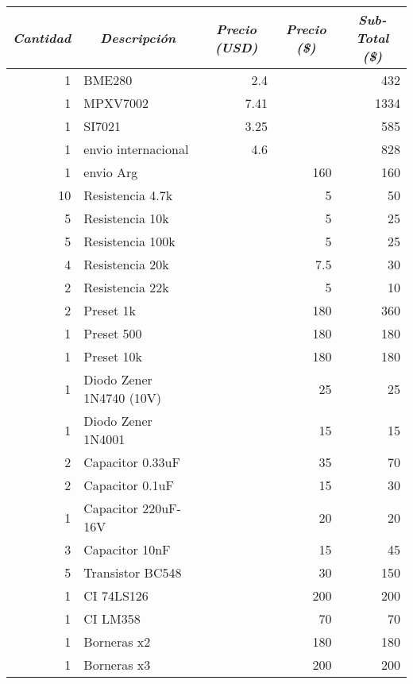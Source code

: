 \begin{table}[h]
	\centering
	\begin{tabular}{|r|l|l|r|r|}
		\hline
		\multicolumn{1}{|c|}{\textit{\textbf{Cantidad}}} & \multicolumn{1}{c|}{\textit{\textbf{Descripción}}} & \multicolumn{1}{c|}{\textit{\textbf{Precio (USD)}}} & \multicolumn{1}{c|}{\textit{\textbf{Precio (\$)}}} & \multicolumn{1}{c|}{\textit{\textbf{Sub-Total  (\$)}}} \\ \hline
		1 & BME280 & \multicolumn{1}{r|}{2.4} & \multicolumn{1}{l|}{} & 432 \\ \hline
		1 & MPXV7002 & \multicolumn{1}{r|}{7.41} & \multicolumn{1}{l|}{} & 1334 \\ \hline
		1 & SI7021 & \multicolumn{1}{r|}{3.25} & \multicolumn{1}{l|}{} & 585 \\ \hline
		1 & envio internacional & \multicolumn{1}{r|}{4.6} & \multicolumn{1}{l|}{} & 828 \\ \hline
		1 & envio Arg &  & 160 & 160 \\ \hline
		10 & Resistencia 4.7k &  & 5 & 50 \\ \hline
		5 & Resistencia 10k &  & 5 & 25 \\ \hline
		5 & Resistencia 100k &  & 5 & 25 \\ \hline
		4 & Resistencia 20k &  & 7.5 & 30 \\ \hline
		2 & Resistencia 22k &  & 5 & 10 \\ \hline
		2 & Preset 1k &  & 180 & 360 \\ \hline
		1 & Preset 500 & \multicolumn{1}{r|}{} & 180 & 180 \\ \hline
		1 & Preset 10k &  & 180 & 180 \\ \hline
		1 & Diodo Zener 1N4740 (10V) &  & 25 & 25 \\ \hline
		1 & Diodo Zener 1N4001 &  & 15 & 15 \\ \hline
		2 & Capacitor 0.33uF &  & 35 & 70 \\ \hline
		2 & Capacitor 0.1uF &  & 15 & 30 \\ \hline
		1 & Capacitor 220uF-16V &  & 20 & 20 \\ \hline
		3 & Capacitor 10nF &  & 15 & 45 \\ \hline
		5 & Transistor BC548 &  & 30 & 150 \\ \hline
		1 & CI 74LS126 &  & 200 & 200 \\ \hline
		1 & CI LM358 &  & 70 & 70 \\ \hline
		1 & Borneras x2 &  & 180 & 180 \\ \hline
		1 & Borneras x3 &  & 200 & 200 \\ \hline

\end{tabular}
\end{table}
